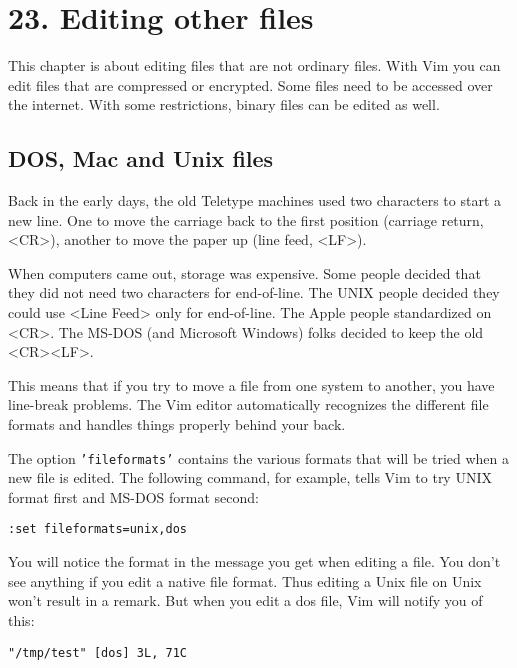 \section{23. Editing other files}
This chapter is about editing files that are not ordinary files.  With Vim you
can edit files that are compressed or encrypted.  Some files need to be
accessed over the internet.  With some restrictions, binary files can be
edited as well.
\localtableofcontents
\subsection{DOS, Mac and Unix files}
Back in the early days, the old Teletype machines used two characters to start a new line.
One to move the carriage back to the first position (carriage return, <CR>), another to move the paper up (line feed, <LF>).

When computers came out, storage was expensive.
Some people decided that they did not need two characters for end-of-line.
The UNIX people decided they could use <Line Feed> only for end-of-line.
The Apple people standardized on <CR>.
The MS-DOS (and Microsoft Windows) folks decided to keep the old <CR><LF>.

This means that if you try to move a file from one system to another, you have line-break problems.
The Vim editor automatically recognizes the different file formats and handles things properly behind your back.

The option \texttt{'fileformats'} contains the various formats that will be tried when a new file is edited.
The following command, for example, tells Vim to try UNIX format first and MS-DOS format second:

\begin{Verbatim}[samepage=true]
 :set fileformats=unix,dos
\end{Verbatim}

You will notice the format in the message you get when editing a file.
You don't see anything if you edit a native file format.
Thus editing a Unix file on Unix won't result in a remark.
But when you edit a dos file, Vim will notify you of this:

\begin{Verbatim}[samepage=true]
    "/tmp/test" [dos] 3L, 71C
\end{Verbatim}

